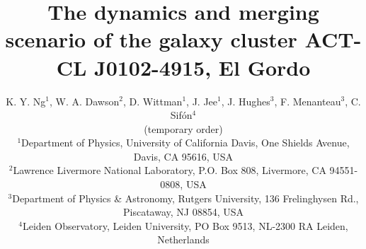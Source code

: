 


\title[The dynamics and merging scenario of ACT-CL
J0102-4915, El Gordo]{The dynamics and merging scenario of the galaxy cluster 
ACT-CL J0102-4915, 
El Gordo}
\author[K. Y. Ng et al.]{K. Y. Ng$^{1}$, W. A. Dawson$^{2}$, D. Wittman$^{1}$, J.
Jee$^{1}$, J. Hughes$^{3}$, F. Menanteau$^{3}$, C. Sif\'{o}n$^{4}$\\
(temporary order)\\
$^{1}$Department of Physics, University of California Davis, One Shields
Avenue, Davis, CA 95616, USA\\ 
$^{2}$Lawrence Livermore National Laboratory, P.O. Box 808, Livermore, CA
94551-0808, USA \\
$^3$Department of Physics \& Astronomy,
Rutgers University, 136 Frelinghysen Rd., Piscataway, NJ 08854, USA\\
$^{4}$Leiden Observatory, Leiden University, PO Box 9513, NL-2300 RA
Leiden, Netherlands\\}


